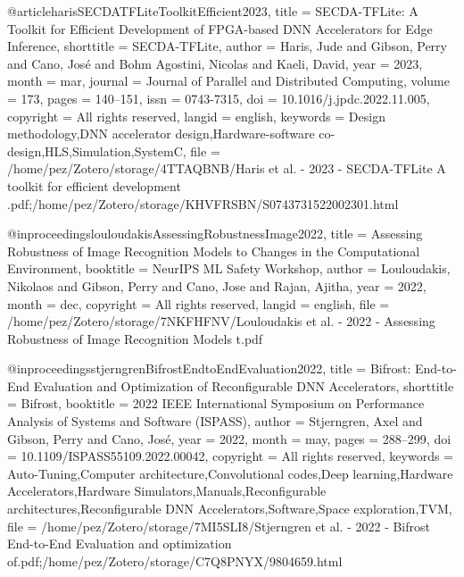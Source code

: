 @article{harisSECDATFLiteToolkitEfficient2023,
  title = {{{SECDA-TFLite}}: {{A}} Toolkit for Efficient Development of {{FPGA-based DNN}} Accelerators for Edge Inference},
  shorttitle = {{{SECDA-TFLite}}},
  author = {Haris, Jude and Gibson, Perry and Cano, Jos{\'e} and Bohm Agostini, Nicolas and Kaeli, David},
  year = {2023},
  month = mar,
  journal = {Journal of Parallel and Distributed Computing},
  volume = {173},
  pages = {140--151},
  issn = {0743-7315},
  doi = {10.1016/j.jpdc.2022.11.005},
  copyright = {All rights reserved},
  langid = {english},
  keywords = {Design methodology,DNN accelerator design,Hardware-software co-design,HLS,Simulation,SystemC},
  file = {/home/pez/Zotero/storage/4TTAQBNB/Haris et al. - 2023 - SECDA-TFLite A toolkit for efficient development .pdf;/home/pez/Zotero/storage/KHVFRSBN/S0743731522002301.html}
}

@inproceedings{louloudakisAssessingRobustnessImage2022,
  title = {Assessing {{Robustness}} of {{Image Recognition Models}} to {{Changes}} in the {{Computational Environment}}},
  booktitle = {{{NeurIPS ML Safety Workshop}}},
  author = {Louloudakis, Nikolaos and Gibson, Perry and Cano, Jose and Rajan, Ajitha},
  year = {2022},
  month = dec,
  copyright = {All rights reserved},
  langid = {english},
  file = {/home/pez/Zotero/storage/7NKFHFNV/Louloudakis et al. - 2022 - Assessing Robustness of Image Recognition Models t.pdf}
}

@inproceedings{stjerngrenBifrostEndtoEndEvaluation2022,
  title = {Bifrost: {{End-to-End Evaluation}} and Optimization of {{Reconfigurable DNN Accelerators}}},
  shorttitle = {Bifrost},
  booktitle = {2022 {{IEEE International Symposium}} on {{Performance Analysis}} of {{Systems}} and {{Software}} ({{ISPASS}})},
  author = {Stjerngren, Axel and Gibson, Perry and Cano, Jos{\'e}},
  year = {2022},
  month = may,
  pages = {288--299},
  doi = {10.1109/ISPASS55109.2022.00042},
  copyright = {All rights reserved},
  keywords = {Auto-Tuning,Computer architecture,Convolutional codes,Deep learning,Hardware Accelerators,Hardware Simulators,Manuals,Reconfigurable architectures,Reconfigurable DNN Accelerators,Software,Space exploration,TVM},
  file = {/home/pez/Zotero/storage/7MI5SLI8/Stjerngren et al. - 2022 - Bifrost End-to-End Evaluation and optimization of.pdf;/home/pez/Zotero/storage/C7Q8PNYX/9804659.html}
}
